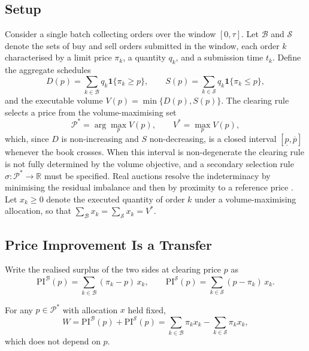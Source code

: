 \subsection{Setup}

Consider a single batch collecting orders over the window $[0,\tau]$.
Let $\mathcal{B}$ and $\mathcal{S}$ denote the sets of buy and sell
orders submitted in the window, each order $k$ characterised by a limit
price $\pi_k$, a quantity $q_k$, and a submission time $t_k$. Define the
aggregate schedules
\begin{equation}
  D(p) = \sum_{k \in \mathcal{B}} q_k \mathbf{1}\{\pi_k \ge p\},
  \qquad
  S(p) = \sum_{k \in \mathcal{S}} q_k \mathbf{1}\{\pi_k \le p\},
\end{equation}
and the executable volume $V(p) = \min\{D(p), S(p)\}$. The clearing rule
selects a price from the volume-maximising set
\begin{equation}
  \mathcal{P}^{*} = \arg\max_{p} V(p),
  \qquad V^{*} = \max_p V(p),
\end{equation}
which, since $D$ is non-increasing and $S$ non-decreasing, is a closed
interval $[\underline{p}, \overline{p}]$ whenever the book crosses. When
this interval is non-degenerate the clearing rule is not fully
determined by the volume objective, and a secondary selection rule
$\sigma : \mathcal{P}^{*} \to \mathbb{R}$ must be specified. Real
auctions resolve the indeterminacy by minimising the residual imbalance
and then by proximity to a reference price
\citep{haynes2020precedence}. Let $x_k \ge 0$ denote the executed
quantity of order $k$ under a volume-maximising allocation, so that
$\sum_{\mathcal{B}} x_k = \sum_{\mathcal{S}} x_k = V^{*}$.

\subsection{Price Improvement Is a Transfer}

Write the realised surplus of the two sides at clearing price $p$ as
\begin{equation}
  \mathrm{PI}^{\mathcal{B}}(p)
    = \sum_{k \in \mathcal{B}} (\pi_k - p)\, x_k,
  \qquad
  \mathrm{PI}^{\mathcal{S}}(p)
    = \sum_{k \in \mathcal{S}} (p - \pi_k)\, x_k .
\end{equation}

\begin{lemma}
\label{lem:invariance}
For any $p \in \mathcal{P}^{*}$ with allocation $x$ held fixed,
\begin{equation}
  W = \mathrm{PI}^{\mathcal{B}}(p) + \mathrm{PI}^{\mathcal{S}}(p)
    = \sum_{k \in \mathcal{B}} \pi_k x_k
      - \sum_{k \in \mathcal{S}} \pi_k x_k ,
\end{equation}
which does not depend on $p$.
\end{lemma}



